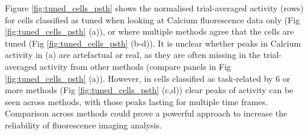 \documentclass[a4paper,10pt,twocolumn]{article}
\begin{document}

Figure \ref{fig:tuned_cells_psth} shows the normalised trial-averaged activity (rows) for cells classified as tuned when looking at Calcium fluorescence data only (Fig \ref{fig:tuned_cells_psth} (a)), or where multiple methods agree that the cells are tuned (Fig \ref{fig:tuned_cells_psth} (b-d)). It is unclear whether peaks in Calcium activity in (a) are artefactual or real, as they are often missing in the trial-averaged activity from other methods (compare panels in Fig \ref{fig:tuned_cells_psth} (a)). However, in cells classified as task-related by 6 or more methods (Fig \ref{fig:tuned_cells_psth} (c,d)) clear peaks of activity can be seen across methods, with those peaks lasting for multiple time frames. Comparison across methods could prove a powerful approach to increase the reliability of fluorescence imaging analysis.
\end{document}
